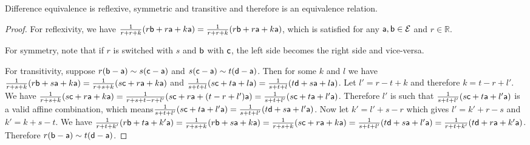 \begin{mathSection}
	\begin{prop}
		Difference equivalence is reflexive, symmetric and transitive and therefore is an equivalence relation.
	\end{prop}
	
	\begin{proof}
		For reflexivity, we have $\frac{1}{r+r+k} (r \ens[b] + r \ens[a] + k \ens[a]) = \frac{1}{r+r+k} (r \ens[b] + r \ens[a] + k \ens[a])$, which is satisfied for any $\ens[a], \ens[b] \in \Ens$ and $r \in \mathbb{R}$.
		
		For symmetry, note that if $r$ is switched with $s$ and $\ens[b]$ with $\ens[c]$, the left side becomes the right side and vice-versa.
		
		For transitivity, suppose $r(\ens[b] - \ens[a]) \sim s(\ens[c] - \ens[a])$ and $s(\ens[c] - \ens[a]) \sim t(\ens[d] - \ens[a])$. Then for some $k$ and $l$ we have $\frac{1}{r+s+k} (r \ens[b] + s \ens[a] + k \ens[a]) = \frac{1}{r+s+k} (s \ens[c] + r \ens[a] + k \ens[a])$ and $\frac{1}{s+t+l} (s \ens[c] + t \ens[a] + l \ens[a]) = \frac{1}{s+t+l} (t \ens[d] + s \ens[a] + l \ens[a])$. Let $l' = r - t + k$ and therefore $k = t - r + l'$. We have $\frac{1}{r+s+k} (s \ens[c] + r \ens[a] + k \ens[a]) = \frac{1}{r+s+t-r+l'} (s \ens[c] + r \ens[a] + (t-r +l') \ens[a]) = \frac{1}{s+t+l'} (s \ens[c] + t \ens[a] + l' \ens[a])$. Therefore $l'$ is such that $\frac{1}{s+t+l'} (s \ens[c] + t \ens[a] + l' \ens[a])$ is a valid affine combination, which means$\frac{1}{s+t+l'} (s \ens[c] + t \ens[a] + l' \ens[a]) =\frac{1}{s+t+l'} (t \ens[d] + s \ens[a] + l' \ens[a])$. Now let $k' = l' + s -r$ which gives $l' = k' + r -s$ and $k' = k + s - t$. We have $\frac{1}{r+t+k'} (r \ens[b] + t \ens[a] + k' \ens[a]) = \frac{1}{r+s+k} (r \ens[b] + s \ens[a] + k \ens[a]) = \frac{1}{r+s+k} (s \ens[c] + r \ens[a] + k \ens[a]) = \frac{1}{s+t+l'} (t \ens[d] + s \ens[a] + l' \ens[a]) = \frac{1}{r+t+k'} (t \ens[d] + r \ens[a] + k' \ens[a])$. Therefore $r(\ens[b] - \ens[a]) \sim t(\ens[d] - \ens[a])$.
	\end{proof}
	

\end{mathSection}
